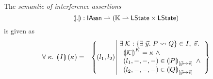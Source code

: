 %
%
\begin{definition}
The \emph{semantic of interference assertions}
%
\[
	\left( \hspace*{-2pt}\left| . \right| \hspace*{-2pt} \right) : \textsf{IAssn} \rightharpoonup \left(\mathbb{K} \rightharpoonup  \textsf{LState} \times \textsf{LState} \right)
\]
%
is given as
%
\[
\begin{array}{r l}
	\for{\kappa} \intermediateSemI{I}(\ca{}) =
	 	&
	 	\left\{
		\begin{array}{l | r}
			
			\hspace*{-0.2cm}(l_1, l_2)\hspace*{-0.1cm} & 
			\hspace*{-0.2cm}
			\begin{array}{l}
				\exsts{\interAss{\capAss{}}{\vec{y}}{P}{Q} \in I,\; \vec{v}}\\
	
				\hspace*{0.2cm}
				\semK[]{\capAss{}} = \ca{} \; \land\\
				
				\hspace*{0.2cm}
				(l_1, -, -, -) \in \intermediateSem[\text{[} \vec{y} \mapsto \vec{v} \text{]}]{P} \;\land\\
				

				
				\hspace*{0.2cm}
				(l_2, -, -, -) \in \intermediateSem[\text{[} \vec{y} \mapsto \vec{v} \text{]}]{Q} 
				
			\end{array}
		\end{array}
	\hspace*{-0.2cm}
	\right\}\\\\
	
%	
%	
%			
	
\end{array}
\]
%
\end{definition}
